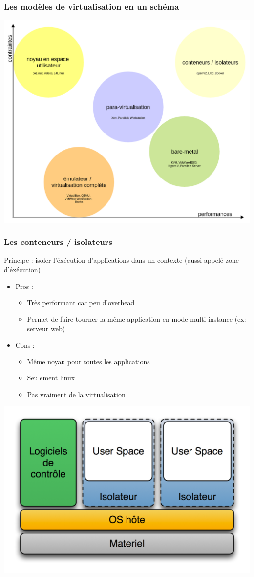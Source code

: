   \begin{frame}
    \frametitle{Les modèles de virtualisation en un schéma}
    \begin{center}
      \includegraphics[width=0.8\linewidth]{images/solutions-virtualisation-2.png}
    \end{center}
  \end{frame}
  
  \begin{frame}
    \frametitle{Les conteneurs / isolateurs}
    Principe : isoler l'éxécution d'applications dans un contexte (aussi appelé zone d'éxécution)
    \begin{itemize}
      \item Pros :
      \begin{itemize}
        \item Très performant car peu d'overhead 
        \item Permet de faire tourner la même application en mode multi-instance (ex: serveur web)
      \end{itemize}
      \item Cons :
      \begin{itemize}
        \item Même noyau pour toutes les applications
        \item Seulement linux
        \item Pas vraiment de la virtualisation
      \end{itemize}
    \end{itemize}
    \begin{center}
      \includegraphics[width=0.5\linewidth]{images/Diagramme_ArchiIsolateur.png}
    \end{center}
  \end{frame}
  
